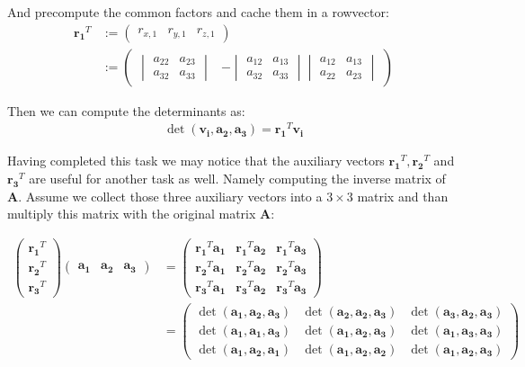 \documentclass{article}
\newcommand{\vctr}[1]{\mathbf{#1}}
\newcommand{\mat}[1]{\mathbf{#1}}
\newcommand{\rowvec}[1]{\begin{pmatrix}#1\end{pmatrix}}
\newcommand{\matCol}[1]{\vctr{a_{#1}}}
\begin{document}
And precompute the common factors and cache them in a rowvector:
\begin{align*}
\vctr{r_1}^T &:= \rowvec{r_{x, 1} & r_{y, 1} & r_{z, 1}} \\
&:= 
\rowvec{
\begin{vmatrix}
a_{22} & a_{23} \\
a_{32} & a_{33}
\end{vmatrix} &
- \begin{vmatrix}
a_{12} & a_{13} \\
a_{32} & a_{33}
\end{vmatrix}
\begin{vmatrix}
a_{12} & a_{13} \\
a_{22} & a_{23}
\end{vmatrix}}
\end{align*}

Then we can compute the determinants as:
\begin{align*}
\det(\vctr{v_i}, \matCol{2}, \matCol{3}) = \vctr{r_1}^T \vctr{v_i}
\end{align*}

Having completed this task we may notice that the auxiliary vectors \(\vctr{r_1}^T, \vctr{r_2}^T\) and \(\vctr{r_3}^T\) are useful for another task as well. Namely computing the inverse matrix of \(\mat{A}\). Assume we collect those three auxiliary vectors into a \(3\times 3\) matrix and than multiply this matrix with the original matrix \(\mat{A}\):


\begin{align*}
\begin{pmatrix}
\vctr{r_1}^T\\
\vctr{r_2}^T\\
\vctr{r_3}^T
\end{pmatrix} 
\begin{pmatrix}
\matCol{1} & \matCol{2} & \matCol{3}
\end{pmatrix}
&= 
\begin{pmatrix}
\vctr{r_1}^T\matCol{1} & \vctr{r_1}^T\matCol{2} & \vctr{r_1}^T\matCol{3}\\
\vctr{r_2}^T\matCol{1} & \vctr{r_2}^T\matCol{2} & \vctr{r_2}^T\matCol{3}\\
\vctr{r_3}^T\matCol{1} & \vctr{r_3}^T\matCol{2} & \vctr{r_3}^T\matCol{3}
\end{pmatrix}\\
&= 
\begin{pmatrix}
\det(\matCol{1}, \matCol{2}, \matCol{3}) & \det(\matCol{2}, \matCol{2}, \matCol{3}) & \det(\matCol{3}, \matCol{2}, \matCol{3})\\
\det(\matCol{1}, \matCol{1}, \matCol{3}) & \det(\matCol{1}, \matCol{2}, \matCol{3}) & \det(\matCol{1}, \matCol{3}, \matCol{3})\\
\det(\matCol{1}, \matCol{2}, \matCol{1}) & \det(\matCol{1}, \matCol{2}, \matCol{2}) & \det(\matCol{1}, \matCol{2}, \matCol{3})
\end{pmatrix}
\end{align*}
\end{document}
